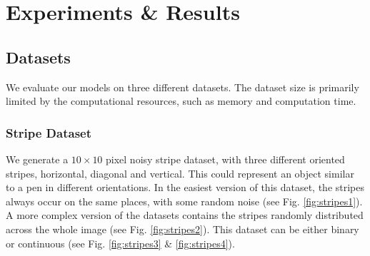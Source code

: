 \chapter{Experiments \& Results} \label{c:expres}

\section{Datasets} \label{c:datasets}
 
We evaluate our models on three different datasets.
The dataset size is primarily limited by the computational resources, such as memory and computation time. 

\subsection{Stripe Dataset} \label{c:stripes}

We generate a $10 \times 10$ pixel noisy stripe dataset, with three different oriented stripes, horizontal, diagonal and vertical. 
This could represent an object similar to a pen in different orientations.
In the easiest version of this dataset, the stripes always occur on the same places, with some random noise (see Fig. \ref{fig:stripes1}).
A more complex version of the datasets contains the stripes randomly distributed across the whole image (see Fig. \ref{fig:stripes2}).
This dataset can be either binary or continuous (see Fig. \ref{fig:stripes3} \& \ref{fig:stripes4}).



